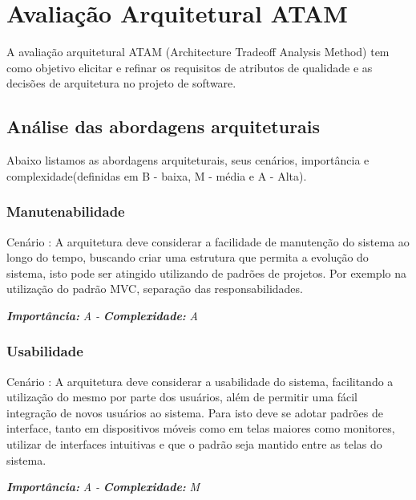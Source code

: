 \pgfmathsetmacro{}
\chapter{Avaliação Arquitetural ATAM}

A avaliação arquitetural ATAM (Architecture Tradeoff Analysis Method) tem como objetivo elicitar e refinar os requisitos de atributos de qualidade e 
as decisões de arquitetura no projeto de software.\cite{Mendes:2002}

\section{Análise das abordagens arquiteturais}
\vspace{0.5cm}

Abaixo listamos as abordagens arquiteturais, seus cenários, importância e complexidade(definidas em B - baixa, M - média e A - Alta).

\vspace{0.5cm}

\pgfmathtruncatemacro{}
\subsection{Manutenabilidade}
Cenário \nava: A arquitetura deve considerar a facilidade de manutenção do sistema ao longo do tempo, buscando
criar uma estrutura que permita a evolução do sistema, isto pode ser atingido utilizando de padrões de projetos. 
Por exemplo na utilização do padrão MVC, separação das responsabilidades.

\vspace{0.5cm}
\noindent\textbf{\textit{Importância:}} \textit{A -} \textbf{\textit{Complexidade:}} \textit{A}
\vspace{0.5cm}

\pgfmathtruncatemacro{}
\subsection{Usabilidade}
Cenário \nava: A arquitetura deve considerar a usabilidade do sistema, facilitando a utilização do mesmo por parte dos usuários,
além de permitir uma fácil integração de novos usuários ao sistema. Para isto deve se adotar padrões de interface, tanto em dispositivos
móveis como em telas maiores como monitores, utilizar de interfaces intuitivas e que o padrão seja mantido entre as telas do sistema.

\vspace{0.5cm}
\noindent\textbf{\textit{Importância:}} \textit{A -} \textbf{\textit{Complexidade:}} \textit{M}
\vspace{0.5cm}

